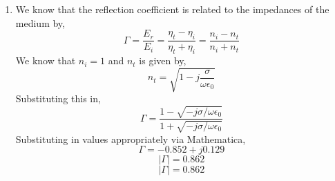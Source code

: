 \documentclass[12pt]{article}
\begin{document}
\begin{enumerate}
\begin{enumerate}
		\item [(b)]
		We know that the reflection coefficient is related to the impedances of the medium by,
		\[\Gamma =\frac{E_r}{E_i}=\frac{\eta_t-\eta_i}{\eta_t+\eta_i}=\frac{n_i-n_t}{n_i+n_t}\]
		We know that $n_i=1$ and $n_t$ is given by,
		\[n_t=\sqrt{1-j\frac{\sigma}{\omega \epsilon_0}}\]
		Substituting this in,
		\[\Gamma = \frac{1-\sqrt{-j\sigma/\omega\epsilon_0}}{1+\sqrt{-j\sigma/\omega\epsilon_0}}\]
		Substituting in values appropriately via Mathematica,
		\[\Gamma = -0.852+j0.129\]
		\[|\Gamma| = 0.862\]
		\[\boxed{|\Gamma| = 0.862}\]


\end{enumerate}
\end{enumerate}
\end{document}
